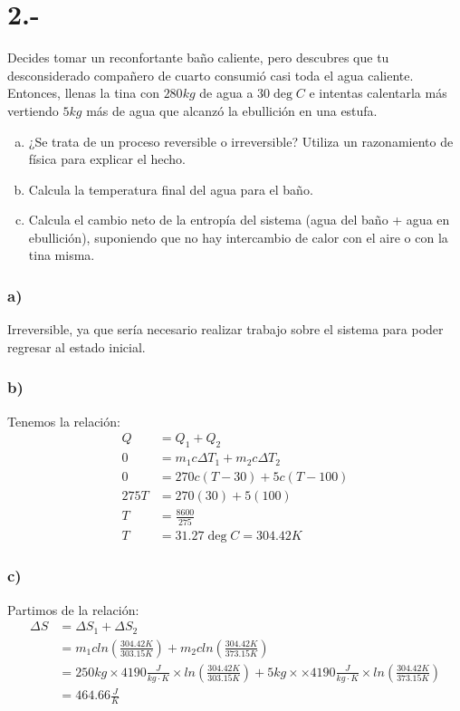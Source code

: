 \documentclass{article}
\begin{document}
\section*{2.-}
Decides tomar un reconfortante baño caliente, pero descubres que tu desconsiderado compañero de cuarto consumió casi toda el 
agua caliente. Entonces, llenas la tina con $280kg$ de agua a $30 \deg C$ e intentas calentarla más vertiendo $5kg$ más de agua 
que alcanzó la ebullición en una estufa.
\begin{enumerate}[a)]
    \item ¿Se trata de un proceso reversible o irreversible? Utiliza un razonamiento de física para explicar el hecho.
    \item Calcula la temperatura final del agua para el baño.
    \item Calcula el cambio neto de la entropía del sistema (agua del baño + agua en ebullición), suponiendo
    que no hay intercambio de calor con el aire o con la tina misma.
\end{enumerate}
\begin{tcolorbox}[breakable]
    \subsubsection*{a)}
    Irreversible, ya que sería necesario realizar trabajo sobre el sistema
    para poder regresar al estado inicial.

    \subsubsection*{b)}
    Tenemos la relación:
    \begin{align*}
        Q &= Q_1+Q_2 \\ 
        0 &= m_1c\Delta T_1+m_2c\Delta T_2 \\
        0 &= 270c(T-30)+5c(T-100) \\
        275T &= 270(30)+5(100) \\
        T &= \frac{8600}{275} \\
        T &= 31.27 \deg C = 304.42 K
    \end{align*}
    \subsubsection*{c)}
    Partimos de la relación:
    \begin{align*}
        \Delta S 
        &= \Delta S_1 + \Delta S_2 \\
        &= m_1cln(\tfrac{304.42K}{303.15K}) + m_2cln(\tfrac{304.42K}{373.15K}) \\
        &= 250kg \times 4190 \tfrac{J}{kg \cdot K} \times ln(\tfrac{304.42K}{303.15K}) + 5kg \times \times 4190 \tfrac{J}{kg \cdot K} \times ln(\tfrac{304.42K}{373.15K}) \\
        &= 464.66 \tfrac{J}{K}
    \end{align*}
\end{tcolorbox}
\end{document}
